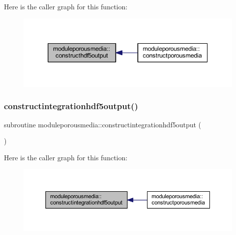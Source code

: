 Here is the caller graph for this function\+:\nopagebreak
\begin{figure}[H]
\begin{center}
\leavevmode
\includegraphics[width=339pt]{namespacemoduleporousmedia_a222cfa7f29b1db2fb4ab637f6c27c28e_icgraph}
\end{center}
\end{figure}
\mbox{\label{namespacemoduleporousmedia_ad4d7e80e82397566cbd292b6c16a78f8}} 
\subsubsection{\texorpdfstring{constructintegrationhdf5output()}{constructintegrationhdf5output()}}
{\footnotesize\ttfamily subroutine moduleporousmedia\+::constructintegrationhdf5output (\begin{DoxyParamCaption}{ }\end{DoxyParamCaption})\hspace{0.3cm}{\ttfamily [private]}}

Here is the caller graph for this function\+:\nopagebreak
\begin{figure}[H]
\begin{center}
\leavevmode
\includegraphics[width=350pt]{namespacemoduleporousmedia_ad4d7e80e82397566cbd292b6c16a78f8_icgraph}
\end{center}
\end{figure}
\mbox{\label{namespacemoduleporousmedia_ac3173bc46df00d4f9eeea325d87cd8d7}} 
